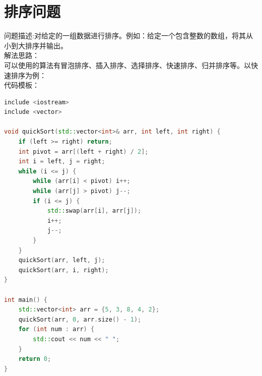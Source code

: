 \documentclass[12pt,twiside,a4paper]{ctexbook}
\numberwithin{chapter}{part}
\begin{document}
\section{排序问题}
问题描述:对给定的一组数据进行排序。例如：给定一个包含整数的数组，将其从小到大排序并输出。\\
解法思路：\\
可以使用的算法有冒泡排序、插入排序、选择排序、快速排序、归并排序等。以快速排序为例：\\
代码模板：
\begin{lstlisting}[language=C++]
include <iostream>
include <vector>

void quickSort(std::vector<int>& arr, int left, int right) {
    if (left >= right) return;
    int pivot = arr[(left + right) / 2];
    int i = left, j = right;
    while (i <= j) {
        while (arr[i] < pivot) i++;
        while (arr[j] > pivot) j--;
        if (i <= j) {
            std::swap(arr[i], arr[j]);
            i++;
            j--;
        }
    }
    quickSort(arr, left, j);
    quickSort(arr, i, right);
}

int main() {
    std::vector<int> arr = {5, 3, 8, 4, 2};
    quickSort(arr, 0, arr.size() - 1);
    for (int num : arr) {
        std::cout << num << " ";
    }
    return 0;
}
\end{lstlisting}
\end{document}

